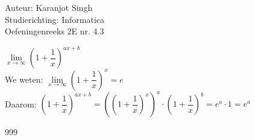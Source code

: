 \documentclass[a4paper]{article}
\begin{document}
	
	\noindent \large Auteur: Karanjot Singh \\
	\noindent \large Studierichting: Informatica\\
	\noindent \large Oefeningenreeks 2E nr. 4.3\\
	
	\medskip
	
	\normalsize
	
	$\lim\limits_{x \to \infty} \left(1 + \dfrac{1}{x}\right)^{ax+b}$\\
	
	We weten:
	$\lim\limits_{x \to \infty} \left(1 + \dfrac{1}{x}\right)^x = e$\\
	
	Daarom:
	$\left(1 + \dfrac{1}{x}\right)^{ax+b} = \left(\left(1 + \dfrac{1}{x}\right)^x\right)^a \cdot \left(1 + \dfrac{1}{x}\right)^b = e^a \cdot 1 = e^a$\\
	
	\begin{thebibliography}{999}
	\end{thebibliography}
\end{document}
